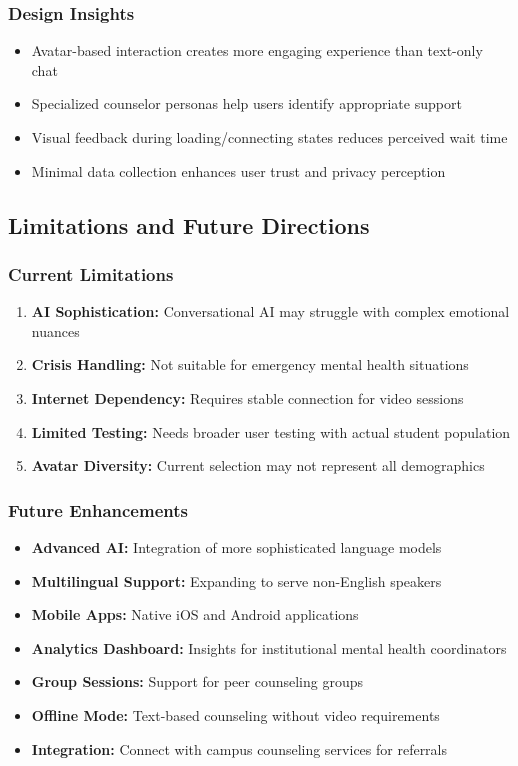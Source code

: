 \documentclass[11pt,a4paper]{article}
\begin{document}
\subsubsection{Design Insights}
\begin{itemize}
    \item Avatar-based interaction creates more engaging experience than text-only chat
    \item Specialized counselor personas help users identify appropriate support
    \item Visual feedback during loading/connecting states reduces perceived wait time
    \item Minimal data collection enhances user trust and privacy perception
\end{itemize}

\subsection{Limitations and Future Directions}

\subsubsection{Current Limitations}
\begin{enumerate}
    \item \textbf{AI Sophistication:} Conversational AI may struggle with complex emotional nuances
    \item \textbf{Crisis Handling:} Not suitable for emergency mental health situations
    \item \textbf{Internet Dependency:} Requires stable connection for video sessions
    \item \textbf{Limited Testing:} Needs broader user testing with actual student population
    \item \textbf{Avatar Diversity:} Current selection may not represent all demographics
\end{enumerate}

\subsubsection{Future Enhancements}
\begin{itemize}
    \item \textbf{Advanced AI:} Integration of more sophisticated language models
    \item \textbf{Multilingual Support:} Expanding to serve non-English speakers
    \item \textbf{Mobile Apps:} Native iOS and Android applications
    \item \textbf{Analytics Dashboard:} Insights for institutional mental health coordinators
    \item \textbf{Group Sessions:} Support for peer counseling groups
    \item \textbf{Offline Mode:} Text-based counseling without video requirements
    \item \textbf{Integration:} Connect with campus counseling services for referrals
\end{itemize}
\end{document}
